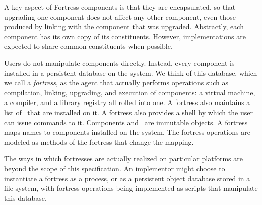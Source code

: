 A key aspect of Fortress components is that they are encapsulated,
so that upgrading one component does not affect any other component,
even those produced by linking with the component that was upgraded.
Abstractly, each component has its own copy of its constituents.
However, implementations are expected to share common constituents
when possible.

Users do not manipulate components directly.
Instead,
every component is installed in a persistent database on the system.
We think of this database,
which we call a \emph{fortress},
as the agent that actually performs operations
such as compilation, linking, upgrading,
and execution of components:
a virtual machine, a compiler, and a library registry all rolled into one.
A fortress also maintains a list of \apisN\ that are installed on it.
A fortress also provides a shell
by which the user can issue commands to it.
Components and \apisN\ are immutable objects.
A fortress maps names to components installed on the system.
The fortress operations are modeled
as methods of the fortress that change the mapping.


The ways in which fortresses are actually realized on particular platforms
are beyond the scope of this specification.
An implementor might choose to instantiate a fortress as a process, or as
a persistent object database stored in a file system,
with fortress operations being implemented as scripts
that manipulate this database.
